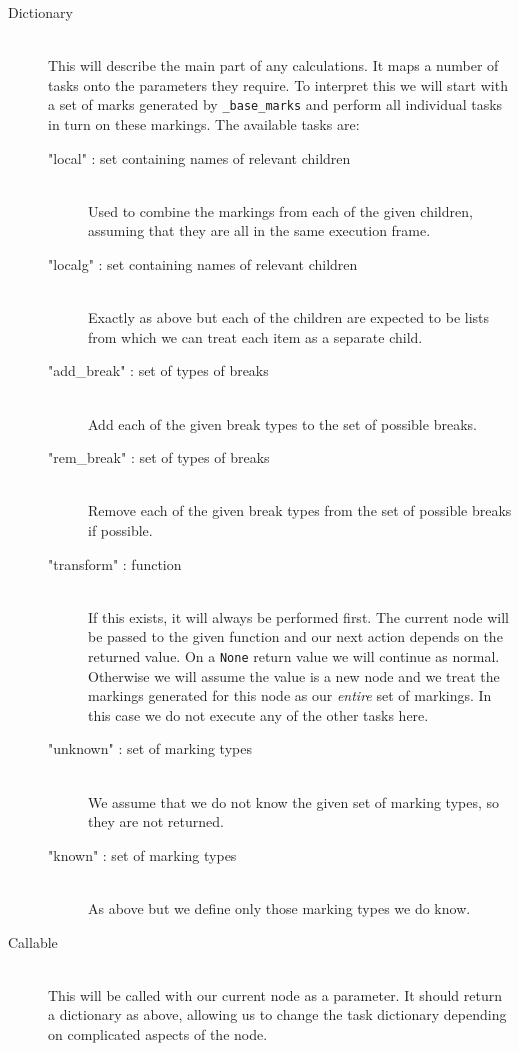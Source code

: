 \documentclass{report}
\begin{document}
\begin{description}
\item[Dictionary] \hfill \\
This will describe the main part of any calculations. It maps a number of tasks onto the parameters they require. To interpret this we will
start with a set of marks generated by \texttt{\_base\_marks} and perform all individual tasks in turn on these markings. The available tasks are:

\begin{description}
\item["local" : set containing names of relevant children] \hfill \\
Used to combine the markings from each of the given children, assuming that they are all in the same execution frame.
\item["localg" : set containing names of relevant children] \hfill \\
Exactly as above but each of the children are expected to be lists from which we can treat each item as a separate child.
\item["add\_break" : set of types of breaks] \hfill \\
Add each of the given break types to the set of possible breaks.
\item["rem\_break" : set of types of breaks] \hfill \\
Remove each of the given break types from the set of possible breaks if possible.
\item["transform" : function] \hfill \\
If this exists, it will always be performed first. The current node will be passed to the given function and our next action depends on the returned value. On a
\texttt{None} return value we will continue as normal. Otherwise we will assume the value is a new node and we treat the markings generated for this node as our
\textit{entire} set of markings. In this case we do not execute any of the other tasks here.
\item["unknown" : set of marking types] \hfill \\
We assume that we do not know the given set of marking types, so they are not returned.
\item["known" : set of marking types] \hfill \\
As above but we define only those marking types we do know.
\end{description}

\item[Callable] \hfill \\
This will be called with our current node as a parameter. It should return a dictionary as above, allowing us to change the task dictionary depending on
complicated aspects of the node.


\end{description}
\end{document}
